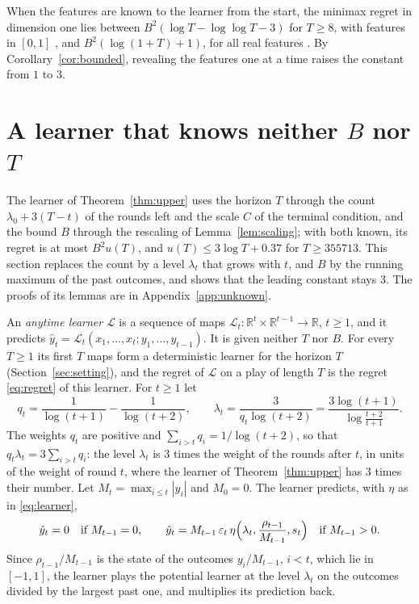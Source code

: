 \documentclass[12pt]{amsart}
\theoremstyle{definition}
\numberwithin{equation}{section}
\newcommand{\R}{\mathbb{R}}
\newcommand{\yh}{\hat y}
\begin{document}
When the features are known to the learner from the start, the minimax regret in dimension one lies between $B^2(\log T-\log\log T-3)$ for $T\ge8$, with features in $[0,1]$ \citep[Theorem~4]{GaillardALT19}, and $B^2(\log(1+T)+1)$, for all real features \citep[Theorem~7]{GaillardALT19}. By Corollary~\ref{cor:bounded}, revealing the features one at a time raises the constant from $1$ to $3$.

\section{A learner that knows neither \texorpdfstring{$B$}{B} nor \texorpdfstring{$T$}{T}}\label{sec:unknown}

The learner of Theorem~\ref{thm:upper} uses the horizon $T$ through the count $\lambda_0+3(T-t)$ of the rounds left and the scale $C$ of the terminal condition, and the bound $B$ through the rescaling of Lemma~\ref{lem:scaling}; with both known, its regret is at most $B^2u(T)$, and $u(T)\le3\log T+0.37$ for $T\ge355713$. This section replaces the count by a level $\lambda_t$ that grows with $t$, and $B$ by the running maximum of the past outcomes, and shows that the leading constant stays $3$. The proofs of its lemmas are in Appendix~\ref{app:unknown}.

An \emph{anytime learner} $\mathcal L$ is a sequence of maps $\mathcal L_t\colon\R^t\times\R^{t-1}\to\R$, $t\ge1$, and it predicts $\yh_t=\mathcal L_t(x_1,\dots,x_t;y_1,\dots,y_{t-1})$. It is given neither $T$ nor $B$. For every $T\ge1$ its first $T$ maps form a deterministic learner for the horizon $T$ (Section~\ref{sec:setting}), and the regret of $\mathcal L$ on a play of length $T$ is the regret \eqref{eq:regret} of this learner. For $t\ge1$ let
\begin{equation}\label{eq:weights}
q_t=\frac1{\log(t+1)}-\frac1{\log(t+2)},\qquad\lambda_t=\frac3{q_t\log(t+2)}=\frac{3\log(t+1)}{\log\frac{t+2}{t+1}} .
\end{equation}
The weights $q_t$ are positive and $\sum_{i>t}q_i=1/\log(t+2)$, so that $q_t\lambda_t=3\sum_{i>t}q_i$: the level $\lambda_t$ is $3$ times the weight of the rounds after $t$, in units of the weight of round $t$, where the learner of Theorem~\ref{thm:upper} has $3$ times their number. Let $M_t=\max_{i\le t}|y_i|$ and $M_0=0$. The learner predicts, with $\eta$ as in \eqref{eq:learner},
\begin{equation}\label{eq:learnerBT}
\yh_t=0\quad\text{if }M_{t-1}=0,\qquad\yh_t=M_{t-1}\,\varepsilon_t\,\eta\Bigl(\lambda_t,\frac{\rho_{t-1}}{M_{t-1}},s_t\Bigr)\quad\text{if }M_{t-1}>0 .
\end{equation}
Since $\rho_{t-1}/M_{t-1}$ is the state of the outcomes $y_i/M_{t-1}$, $i<t$, which lie in $[-1,1]$, the learner plays the potential learner at the level $\lambda_t$ on the outcomes divided by the largest past one, and multiplies its prediction back.
\end{document}
